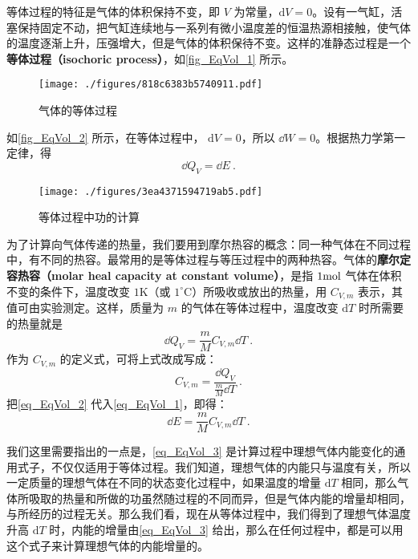

等体过程的特征是气体的体积保持不变，即 $V $ 为常量，$\mathrm dV=0$。设有一气缸，活塞保持固定不动，把气缸连续地与一系列有微小温度差的恒温热源相接触，使气体的温度逐渐上升，压强增大，但是气体的体积保待不变。这样的准静态过程是一个\textbf{等体过程（isochoric process）}，如\autoref{fig_EqVol_1} 所示。
\begin{figure}[ht]
\centering
\texttt{[image: ./figures/818c6383b5740911.pdf]}
\caption{气体的等体过程} \label{fig_EqVol_1}
\end{figure}
如\autoref{fig_EqVol_2} 所示，在等体过程中， $\mathrm dV=0$，所以 $\dd W=0$。根据热力学第一定律，得
\begin{equation} \label{eq_EqVol_1}
\dd Q_{V}=\dd E ~.
\end{equation}
\begin{figure}[ht]
\centering
\texttt{[image: ./figures/3ea4371594719ab5.pdf]}
\caption{等体过程中功的计算} \label{fig_EqVol_2}
\end{figure}
为了计算向气体传递的热量，我们要用到摩尔热容的概念：同一种气体在不同过程中，有不同的热容。最常用的是等体过程与等压过程中的两种热容。气体的\textbf{摩尔定容热容（molar heal capacity at constant volume）}，是指 $1 \rm mol$ 气体在体积不变的条件下，温度改变 $1\mathrm{K}$（或 $1^\circ \mathrm{C}$）所吸收或放出的热量，用 $C_{V,m}$ 表示，其值可由实验测定。这样，质量为 $m $ 的气体在等体过程中，温度改变 $\mathrm dT $ 时所需要的热量就是
\begin{equation} \label{eq_EqVol_2}
\dd Q_{V}=\frac{m}{M} C_{V, {m}} \dd T~.
\end{equation}
作为 $C_{V,m}$ 的定义式，可将上式改成写成：
\begin{equation} 
C_{V, m}=\frac{\dd Q_{V}}{\frac{m}{M} \dd T}~.
\end{equation}
把\autoref{eq_EqVol_2} 代入\autoref{eq_EqVol_1}，即得：
\begin{equation} \label{eq_EqVol_3}
\dd E=\frac{m}{M} C_{V, m} \dd T~.
\end{equation}

我们这里需要指出的一点是，\autoref{eq_EqVol_3} 是计算过程中理想气体内能变化的通用式子，不仅仅适用于等体过程。我们知道，理想气体的内能只与温度有关，所以一定质量的理想气体在不同的状态变化过程中，如果温度的增量 $\mathrm dT $ 相同，那么气体所吸取的热量和所做的功虽然随过程的不同而异，但是气体内能的增量却相同，与所经历的过程无关。那么我们看，现在从等体过程中，我们得到了理想气体温度升高 $\mathrm dT $ 时，内能的增量由\autoref{eq_EqVol_3} 给出，那么在任何过程中，都是可以用这个式子来计算理想气体的内能增量的。

